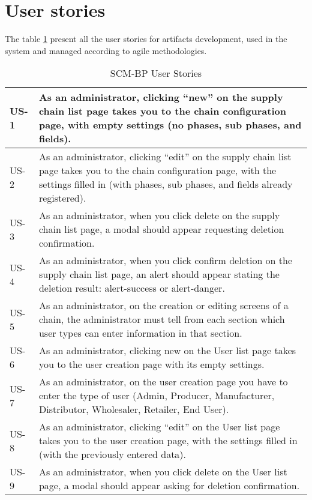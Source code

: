 \section{User stories}{} %

The table \ref{table:userStories} present all the user stories for artifacts development, used in the system and managed according to agile methodologies.

\begin{table}[H]
\caption{\ac{SCM-BP} User Stories}
\label{table:userStories}
    \begin{tabular}{|l|p{13.5cm}|}
    \hline 
    US-1  & As an administrator, clicking “new” on the supply chain list page takes you to the chain configuration page, with empty settings (no phases, sub phases, and fields).\\
    \hline 
    US-2  & As an administrator, clicking “edit” on the supply chain list page takes you to the chain configuration page, with the settings filled in (with phases, sub phases, and fields already registered). \\
    \hline
    US-3  & As an administrator, when you click delete on the supply chain list page, a modal should appear requesting deletion confirmation.\\
    \hline
    US-4  & As an administrator, when you click confirm deletion on the supply chain list page, an alert should appear stating the deletion result: alert-success or alert-danger.\\
    \hline
    US-5  & As an administrator, on the creation or editing screens of a chain, the administrator must tell from each section which user types can enter information in that section.\\
    \hline
    US-6  & As an administrator, clicking new on the User list page takes you to the user creation page with its empty settings.\\
    \hline
    US-7  & As an administrator, on the user creation page you have to enter the type of user (Admin, Producer, Manufacturer, Distributor, Wholesaler, Retailer, End User).\\
    \hline
    US-8  & As an administrator, clicking “edit” on the User list page takes you to the user creation page, with the settings filled in (with the previously entered data).\\
    \hline
    US-9  & As an administrator, when you click delete on the User list page, a modal should appear asking for deletion confirmation.\\

\end{tabular}
\end{table}
